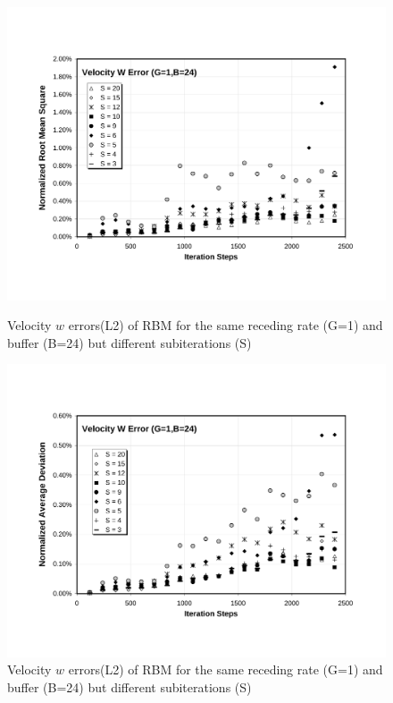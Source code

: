\cp

\begin{figure}[htbp]
  \begin{center}
\includegraphics[scale=0.6]{../figures/Exp3-CASE1-dt0.005/G_1_B_24/G1-B24-W-NRMS.pdf}
    \caption{Velocity $w$ errors(L2) of RBM for the same receding rate (G=1) and buffer (B=24) but different subiterations (S)}
        \vspace{0.5in}
\includegraphics[scale=0.6]{../figures/Exp3-CASE1-dt0.005/G_1_B_24/G1-B24-W-NAD.pdf}
    \caption{Velocity $w$ errors(L2) of RBM for the same receding rate (G=1) and buffer (B=24) but different subiterations (S)}
  \end{center}
\end{figure}

